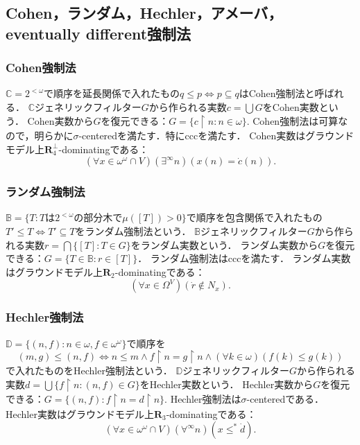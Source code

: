 \documentclass[uplatex,dvipdfmx]{jsarticle}
\newcommand{\B}{\mathbb{B}}
\newcommand{\C}{\mathbb{C}}
\newcommand{\relR}{\mathbf{R}}
\renewcommand\subset{\subseteq}
\theoremstyle{definition}
\begin{document}
	\subsection{Cohen，ランダム，Hechler，アメーバ，eventually different強制法}
	
		\subsubsection{Cohen強制法}
		
		$\C = 2^{<\omega}$で順序を延長関係で入れたもの$q \le p \iff p \subset q$はCohen強制法と呼ばれる．
		$\C$ジェネリックフィルター$G$から作られる実数$c = \bigcup G$をCohen実数という．
		Cohen実数から$G$を復元できる：$G = \{ c \upharpoonright n : n \in \omega \}$.
		Cohen強制法は可算なので，明らかに$\sigma$-centeredを満たす．特にcccを満たす．
		Cohen実数はグラウンドモデル上$\relR_4^\perp$-dominatingである：
		\[
		(\forall x \in \omega^\omega \cap V)(\exists^\infty n)(x(n) = \dot{c}(n)).
		\]
		
		\subsubsection{ランダム強制法}
		
		$\B = \{ T : T\text{は}2^{<\omega}\text{の部分木で}\mu([T]) > 0 \}$で順序を包含関係で入れたもの$T' \le T \iff T' \subset T$をランダム強制法という．
		$\B$ジェネリックフィルター$G$から作られる実数$r = \bigcap \{[T] : T \in G \}$をランダム実数という．
		ランダム実数から$G$を復元できる：$G = \{ T \in \B : r \in [T] \}$．
		ランダム強制法はcccを満たす．
		ランダム実数はグラウンドモデル上$\relR_2$-dominatingである：
		\[
		(\forall x \in \Omega^V)(\dot{r} \not \in N_x).
		\]
		
		\subsubsection{Hechler強制法}
		
		$\mathbb{D} = \{ (n, f) : n \in \omega, f \in \omega^\omega \}$で順序を
		\[(m, g) \le (n, f) \iff n \le m \land f \upharpoonright n = g \upharpoonright n \land (\forall k \in \omega)(f(k) \le g(k))\]
		で入れたものをHechler強制法という．
		$\mathbb{D}$ジェネリックフィルター$G$から作られる実数$d = \bigcup \{ f \upharpoonright n : (n, f) \in G \}$をHechler実数という．
		Hechler実数から$G$を復元できる：$G = \{ (n, f) : f \upharpoonright n = d \upharpoonright n \}$.
		Hechler強制法は$\sigma$-centeredである．
		Hechler実数はグラウンドモデル上$\relR_3$-dominatingである：
		\[
		(\forall x \in \omega^\omega \cap V)(\forall^\infty n)(x \le^* \dot{d}).
		\]
		
\end{document}
